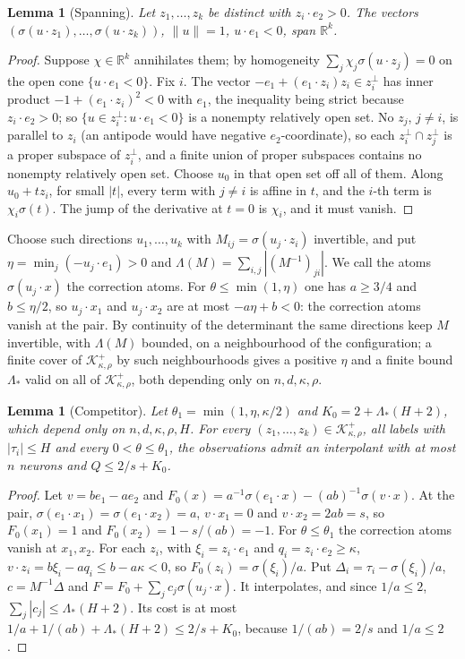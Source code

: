 \documentclass[11pt]{amsart}
\newtheorem{lemma}[theorem]{Lemma}
\theoremstyle{remark}
\numberwithin{equation}{section}
\newcommand{\RR}{\mathbb{R}}
\begin{document}
\begin{lemma}[Spanning]\label{lem:span}
Let $z_1,\dots,z_k$ be distinct with $z_i\cdot e_2>0$. The vectors $(\sigma(u\cdot z_1),\dots,\sigma(u\cdot z_k))$, $\|u\|=1$, $u\cdot e_1<0$, span $\RR^k$.
\end{lemma}
\begin{proof}
Suppose $\chi\in\RR^k$ annihilates them; by homogeneity $\sum_j\chi_j\sigma(u\cdot z_j)=0$ on the open cone $\{u\cdot e_1<0\}$. Fix $i$. The vector $-e_1+(e_1\cdot z_i)z_i\in z_i^\perp$ has inner product $-1+(e_1\cdot z_i)^2<0$ with $e_1$, the inequality being strict because $z_i\cdot e_2>0$; so $\{u\in z_i^\perp:u\cdot e_1<0\}$ is a nonempty relatively open set. No $z_j$, $j\ne i$, is parallel to $z_i$ (an antipode would have negative $e_2$-coordinate), so each $z_i^\perp\cap z_j^\perp$ is a proper subspace of $z_i^\perp$, and a finite union of proper subspaces contains no nonempty relatively open set. Choose $u_0$ in that open set off all of them. Along $u_0+tz_i$, for small $|t|$, every term with $j\ne i$ is affine in $t$, and the $i$-th term is $\chi_i\sigma(t)$. The jump of the derivative at $t=0$ is $\chi_i$, and it must vanish.
\end{proof}

Choose such directions $u_1,\dots,u_k$ with $M_{ij}=\sigma(u_j\cdot z_i)$ invertible, and put $\eta=\min_j(-u_j\cdot e_1)>0$ and $\Lambda(M)=\sum_{i,j}|(M^{-1})_{ji}|$. We call the atoms $\sigma(u_j\cdot x)$ the correction atoms. For $\theta\le\min(1,\eta)$ one has $a\ge3/4$ and $b\le\eta/2$, so $u_j\cdot x_1$ and $u_j\cdot x_2$ are at most $-a\eta+b<0$: the correction atoms vanish at the pair. By continuity of the determinant the same directions keep $M$ invertible, with $\Lambda(M)$ bounded, on a neighbourhood of the configuration; a finite cover of $\mathcal K^+_{\kappa,\rho}$ by such neighbourhoods gives a positive $\eta$ and a finite bound $\Lambda_*$ valid on all of $\mathcal K^+_{\kappa,\rho}$, both depending only on $n,d,\kappa,\rho$.

\begin{lemma}[Competitor]\label{lem:competitor}
Let $\theta_1=\min(1,\eta,\kappa/2)$ and $K_0=2+\Lambda_*(H+2)$, which depend only on $n,d,\kappa,\rho,H$. For every $(z_1,\dots,z_k)\in\mathcal K^+_{\kappa,\rho}$, all labels with $|\tau_i|\le H$ and every $0<\theta\le\theta_1$, the observations admit an interpolant with at most $n$ neurons and $Q\le2/s+K_0$.
\end{lemma}
\begin{proof}
Let $v=be_1-ae_2$ and $F_0(x)=a^{-1}\sigma(e_1\cdot x)-(ab)^{-1}\sigma(v\cdot x)$. At the pair, $\sigma(e_1\cdot x_1)=\sigma(e_1\cdot x_2)=a$, $v\cdot x_1=0$ and $v\cdot x_2=2ab=s$, so $F_0(x_1)=1$ and $F_0(x_2)=1-s/(ab)=-1$. For $\theta\le\theta_1$ the correction atoms vanish at $x_1,x_2$. For each $z_i$, with $\xi_i=z_i\cdot e_1$ and $q_i=z_i\cdot e_2\ge\kappa$, $v\cdot z_i=b\xi_i-aq_i\le b-a\kappa<0$, so $F_0(z_i)=\sigma(\xi_i)/a$. Put $\Delta_i=\tau_i-\sigma(\xi_i)/a$, $c=M^{-1}\Delta$ and $F=F_0+\sum_jc_j\sigma(u_j\cdot x)$. It interpolates, and since $1/a\le2$, $\sum_j|c_j|\le \Lambda_*(H+2)$. Its cost is at most $1/a+1/(ab)+\Lambda_*(H+2)\le2/s+K_0$, because $1/(ab)=2/s$ and $1/a\le2$.
\end{proof}
\end{document}

